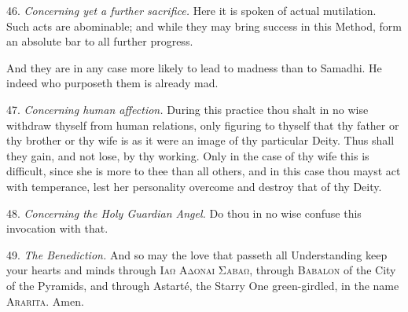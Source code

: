 46. \textit{Concerning yet a further sacrifice.} Here it is spoken of actual mutilation. Such acts are abominable; and while they may bring success in this Method, form an absolute bar to all further progress.

And they are in any case more likely to lead to madness than to Samadhi. He indeed who purposeth them is already mad.

47. \textit{Concerning human affection.} During this practice thou shalt in no wise withdraw thyself from human relations, only figuring to thyself that thy father or thy brother or thy wife is as it were an image of thy particular Deity. Thus shall they gain, and not lose, by thy working. Only in the case of thy wife this is difficult, since she is more to thee than all others, and in this case thou mayst act with temperance, lest her personality overcome and destroy that of thy Deity.

48. \textit{Concerning the Holy Guardian Angel.} Do thou in no wise confuse this invocation with that.

49. \textit{The Benediction.} And so may the love that passeth all Understanding keep your hearts and minds through \textgreek{\textsc{Ιαω Αδοναι Σαβαω}}, through \textsc{Babalon} of the City of the Pyramids, and through Astart\'{e}, the Starry One green-girdled, in the name \textsc{Ararita}. Amen.
